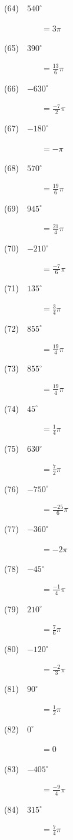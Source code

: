 \documentclass[a4j,twocolumn,10pt,fleqn]{jarticle}
\begin{document}
(64)~~$540^\circ$

~~~~~~~~~$=3\pi$

(65)~~$390^\circ$

~~~~~~~~~$=\frac{13}{6}\pi$

(66)~~$-630^\circ$

~~~~~~~~~$=\frac{-7}{2}\pi$

(67)~~$-180^\circ$

~~~~~~~~~$=-\pi$

(68)~~$570^\circ$

~~~~~~~~~$=\frac{19}{6}\pi$

(69)~~$945^\circ$

~~~~~~~~~$=\frac{21}{4}\pi$

(70)~~$-210^\circ$

~~~~~~~~~$=\frac{-7}{6}\pi$

(71)~~$135^\circ$

~~~~~~~~~$=\frac{3}{4}\pi$

(72)~~$855^\circ$

~~~~~~~~~$=\frac{19}{4}\pi$

(73)~~$855^\circ$

~~~~~~~~~$=\frac{19}{4}\pi$

(74)~~$45^\circ$

~~~~~~~~~$=\frac{1}{4}\pi$

(75)~~$630^\circ$

~~~~~~~~~$=\frac{7}{2}\pi$

(76)~~$-750^\circ$

~~~~~~~~~$=\frac{-25}{6}\pi$

(77)~~$-360^\circ$

~~~~~~~~~$=-2\pi$

(78)~~$-45^\circ$

~~~~~~~~~$=\frac{-1}{4}\pi$

(79)~~$210^\circ$

~~~~~~~~~$=\frac{7}{6}\pi$

(80)~~$-120^\circ$

~~~~~~~~~$=\frac{-2}{3}\pi$

(81)~~$90^\circ$

~~~~~~~~~$=\frac{1}{2}\pi$

(82)~~$0^\circ$

~~~~~~~~~$=0$

(83)~~$-405^\circ$

~~~~~~~~~$=\frac{-9}{4}\pi$

(84)~~$315^\circ$

~~~~~~~~~$=\frac{7}{4}\pi$
\end{document}
